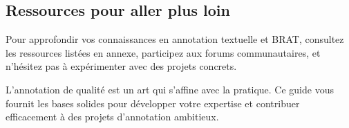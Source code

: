 \subsection{Ressources pour aller plus loin}

Pour approfondir vos connaissances en annotation textuelle et BRAT, consultez les ressources listées en annexe, participez aux forums communautaires, et n'hésitez pas à expérimenter avec des projets concrets.

L'annotation de qualité est un art qui s'affine avec la pratique. Ce guide vous fournit les bases solides pour développer votre expertise et contribuer efficacement à des projets d'annotation ambitieux.

\newpage
